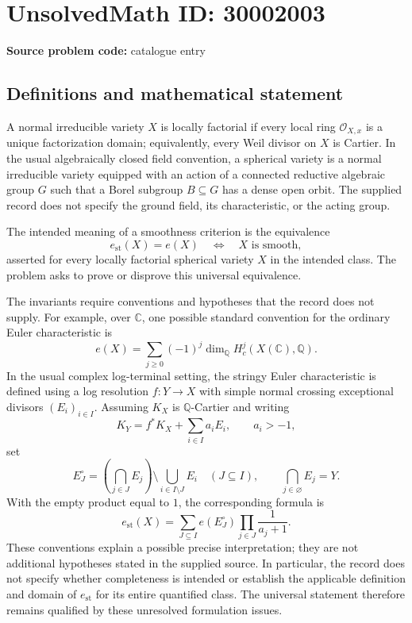 \documentclass[11pt]{article}
\newcommand{\Q}{\mathbb{Q}}
\newcommand{\C}{\mathbb{C}}
\begin{document}
\section*{UnsolvedMath ID: 30002003}
\textbf{Source problem code:} catalogue entry
\subsection{Definitions and mathematical statement}
A normal irreducible variety \(X\) is locally factorial if every local ring \(\mathcal O_{X,x}\) is a unique factorization domain; equivalently, every Weil divisor on \(X\) is Cartier. In the usual algebraically closed field convention, a spherical variety is a normal irreducible variety equipped with an action of a connected reductive algebraic group \(G\) such that a Borel subgroup \(B\subseteq G\) has a dense open orbit. The supplied record does not specify the ground field, its characteristic, or the acting group.

The intended meaning of a smoothness criterion is the equivalence
\[
 e_{\mathrm{st}}(X)=e(X)
 \quad\Longleftrightarrow\quad
 X\text{ is smooth},
\]
asserted for every locally factorial spherical variety \(X\) in the intended class. The problem asks to prove or disprove this universal equivalence.

The invariants require conventions and hypotheses that the record does not supply. For example, over \(\C\), one possible standard convention for the ordinary Euler characteristic is
\[
 e(X)=\sum_{j\geq 0}(-1)^j\dim_{\Q}H_c^j(X(\C),\Q).
\]
In the usual complex log-terminal setting, the stringy Euler characteristic is defined using a log resolution \(f:Y\to X\) with simple normal crossing exceptional divisors \((E_i)_{i\in I}\). Assuming \(K_X\) is \(\Q\)-Cartier and writing
\[
 K_Y=f^*K_X+\sum_{i\in I}a_iE_i,
 \qquad a_i>-1,
\]
set
\[
 E_J^{\circ}=\left(\bigcap_{j\in J}E_j\right)
 \setminus\bigcup_{i\in I\setminus J}E_i
 \quad(J\subseteq I),
 \qquad \bigcap_{j\in\varnothing}E_j=Y.
\]
With the empty product equal to \(1\), the corresponding formula is
\[
 e_{\mathrm{st}}(X)=\sum_{J\subseteq I}
 e(E_J^{\circ})\prod_{j\in J}\frac{1}{a_j+1}.
\]
These conventions explain a possible precise interpretation; they are not additional hypotheses stated in the supplied source. In particular, the record does not specify whether completeness is intended or establish the applicable definition and domain of \(e_{\mathrm{st}}\) for its entire quantified class. The universal statement therefore remains qualified by these unresolved formulation issues.
\end{document}
